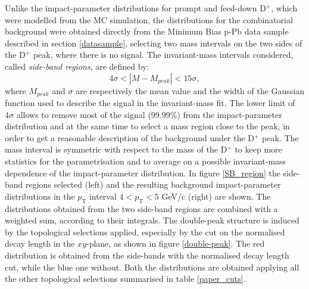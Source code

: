 \documentclass[b5paper,10pt,twoside,oldstyle,classica]{toptesi}
\newcommand{\pt}{p_\text{T}}
\begin{document}
Unlike the impact-parameter distributions for prompt and feed-down D$^+$, which were modelled from the MC simulation, the distributions for the combinatorial background were obtained directly from the Minimum Bias p-Pb data sample described in section \ref{datasample}, selecting two mass intervals on the two sides of the D$^+$ peak, where there is no signal. The invariant-mass intervals considered, called \textit{side-band regions}, are defined by:
\begin{equation}
 4\sigma < |M-M_{peak}| < 15\sigma,
\end{equation}
where $M_{peak}$ and $\sigma$ are respectively the mean value and the width of the Gaussian function used to describe the signal in the invariant-mass fit. The lower limit of $4\sigma$ allows to remove most of the signal (99.99\%) from the impact-parameter distribution and at the same time to select a mass region close to the peak, in order to get a reasonable description of the background under the D$^+$ peak. The mass interval is symmetric with respect to the mass of the D$^+$ to keep more statistics for the parametrisation and to average on a possible invariant-mass dependence of the impact-parameter distribution. In figure \ref{SB_region} the side-band regions selected (left) and the resulting background impact-parameter distributions in the $\pt$ interval $4<\pt<5$ GeV/c (right) are shown. The distributions obtained from the two side-band regions are combined with a weighted sum, according to their integrals. The double-peak structure is induced by the topological selections applied, especially by the cut on the normalised decay length in the $xy$-plane, as shown in figure \ref{double-peak}. 
The red distribution is obtained from the side-bands with the normalised decay length cut, while the blue one without. Both the distributions are obtained applying all the other topological selections summarised in table \ref{paper_cuts}. 
\end{document}
